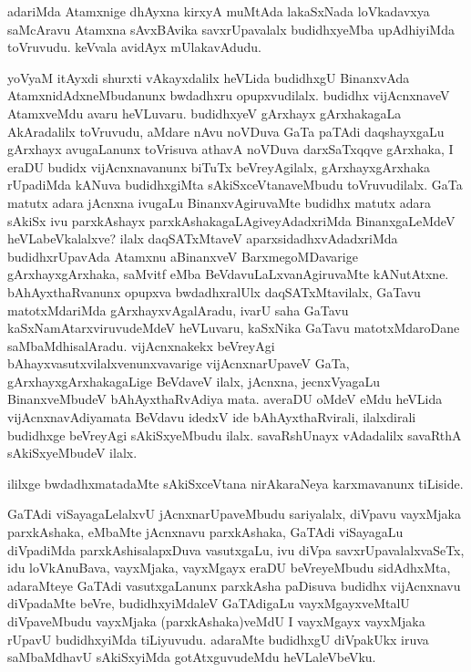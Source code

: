 \begin{artha}%
adariMda Atamxnige dhAyxna kirxyA muMtAda lakaSxNada loVkadavxya saMcAravu Atamxna sAvxBAvika savxrUpavalalx budidhxyeMba upAdhiyiMda toVruvudu. keVvala avidAyx mUlakavAdudu. 
\end{artha}


\begin{artha}
yoV\s yaM itAyxdi shurxti vAkayxdalilx heVLida budidhxgU BinanxvAda AtamxnidAdxneMbudanunx bwdadhxru opupxvudilalx. budidhx vijAcnxnaveV AtamxveMdu avaru heVLuvaru. budidhxyeV gArxhayx gArxhakagaLa AkAradalilx toVruvudu, aMdare nAvu noVDuva GaTa paTAdi daqshayxgaLu gArxhayx avugaLanunx toVrisuva athavA noVDuva darxSaTxqqve gArxhaka, I eraDU budidx vijAcnxnavanunx biTuTx beVreyAgilalx, gArxhayxgArxhaka rUpadiMda kANuva budidhxgiMta sAkiSxceVtanaveMbudu toVruvudilalx. GaTa matutx adara jAcnxna ivugaLu BinanxvAgiruvaMte budidhx matutx adara sAkiSx ivu parxkAshayx parxkAshakagaLAgiveyAdadxriMda BinanxgaLeMdeV heVLabeVkalalxve? ilalx daqSATxMtaveV aparxsidadhxvAdadxriMda budidhxrUpavAda Atamxnu aBinanxveV BarxmegoMDavarige gArxhayxgArxhaka, saMvitf eMba BeVdavuLaLxvanAgiruvaMte kANutAtxne. bAhAyxthaRvanunx opupxva bwdadhxralUlx daqSATxMtavilalx, GaTavu matotxMdariMda gArxhayxvAgalAradu, ivarU saha GaTavu kaSxNamAtarxviruvudeMdeV heVLuvaru, kaSxNika GaTavu matotxMdaroDane saMbaMdhisalAradu. vijAcnxnakekx beVreyAgi bAhayxvasutxvilalxvenunxvavarige vijAcnxnarUpaveV GaTa, gArxhayxgArxhakagaLige BeVdaveV ilalx, jAcnxna, jecnxVyagaLu BinanxveMbudeV bAhAyxthaRvAdiya mata. averaDU oMdeV eMdu heVLida vijAcnxnavAdiyamata BeVdavu idedxV ide bAhAyxthaRvirali, ilalxdirali budidhxge beVreyAgi sAkiSxyeMbudu ilalx. savaRshUnayx vAdadalilx savaRthA sAkiSxyeMbudeV ilalx. 
\end{artha}

\begin{center}
ililxge bwdadhxmatadaMte sAkiSxceVtana nirAkaraNeya karxmavanunx tiLiside. 
\end{center}


\begin{artha}
GaTAdi viSayagaLelalxvU jAcnxnarUpaveMbudu sariyalalx, diVpavu vayxMjaka parxkAshaka, eMbaMte jAcnxnavu parxkAshaka, GaTAdi viSayagaLu diVpadiMda parxkAshisalapxDuva vasutxgaLu, ivu diVpa savxrUpavalalxvaSeTx, idu loVkAnuBava, vayxMjaka, vayxMgayx eraDU beVreyeMbudu sidAdhxMta, adaraMteye GaTAdi vasutxgaLanunx parxkAsha paDisuva budidhx vijAcnxnavu diVpadaMte beVre, budidhxyiMdaleV GaTAdigaLu vayxMgayxveMtalU diVpaveMbudu vayxMjaka (parxkAshaka)veMdU I vayxMgayx vayxMjaka rUpavU budidhxyiMda tiLiyuvudu. adaraMte budidhxgU diVpakUkx iruva saMbaMdhavU sAkiSxyiMda gotAtxguvudeMdu heVLaleVbeVku. 
\end{artha}

